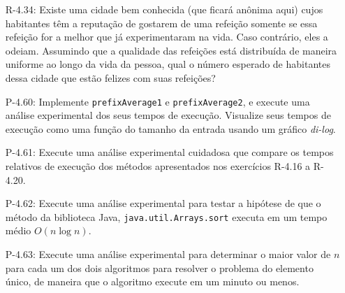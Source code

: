 \begin{enumerate}
\begin{itemize}
		\item[R-4.34:] Existe uma cidade bem conhecida (que ficará anônima aqui) cujos habitantes têm a reputação de gostarem de uma refeição somente se essa refeição for a melhor que já experimentaram na vida. Caso contrário, eles a odeiam. Assumindo que a qualidade das refeições está distribuída de maneira uniforme ao longo da vida da pessoa, qual o número esperado de habitantes dessa cidade que estão felizes com suas refeições?
	
		\item[P-4.60:] Implemente \texttt{prefixAverage1} e \texttt{prefixAverage2}, e execute uma análise experimental dos seus tempos de execução. Visualize seus tempos de execução como uma função do tamanho da entrada usando um gráfico \textit{di-log}.
		
		\item[P-4.61:] Execute uma análise experimental cuidadosa que compare os tempos relativos de execução dos métodos apresentados nos exercícios R-4.16 a R-4.20.
		
		\item[P-4.62:] Execute uma análise experimental para testar a hipótese de que o método da biblioteca Java, \texttt{java.util.Arrays.sort} executa em um tempo médio $O(n \log n)$.
		
		\item[P-4.63:] Execute uma análise experimental para determinar o maior valor de $n$ para cada um dos dois algoritmos para resolver o problema do elemento único, de maneira que o algoritmo execute em um minuto ou menos.
	\end{itemize}
\end{enumerate}

\medskip

\begingroup
	\footnotesize
	\renewcommand{\chapter}[2]{}%
	
	
\endgroup

